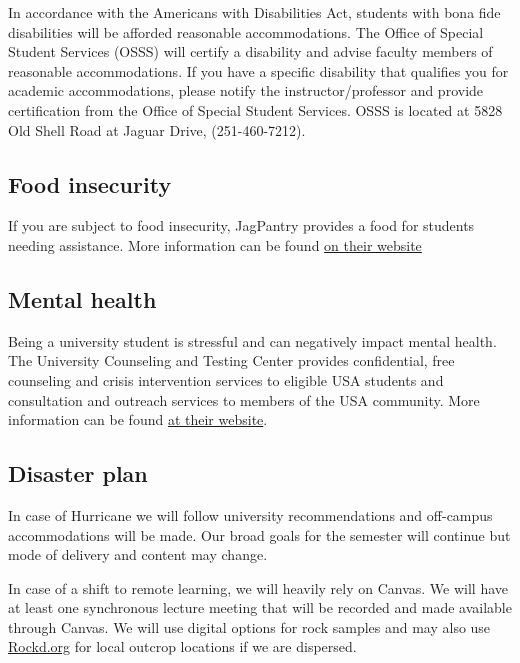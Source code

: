 \documentclass[11pt,]{article}
\begin{document}
In accordance with the Americans with Disabilities Act, students with
bona fide disabilities will be afforded reasonable accommodations. The
Office of Special Student Services (OSSS) will certify a disability and
advise faculty members of reasonable accommodations. If you have a
specific disability that qualifies you for academic accommodations,
please notify the instructor/professor and provide certification from
the Office of Special Student Services. OSSS is located at 5828 Old
Shell Road at Jaguar Drive, (251-460-7212).

\hypertarget{food-insecurity}{%
\subsection{Food insecurity}\label{food-insecurity}}

If you are subject to food insecurity, JagPantry provides a food for
students needing assistance. More information can be found
\href{https://www.southalabama.edu/departments/sga/foodpantry.html}{on
their website}

\hypertarget{mental-health}{%
\subsection{Mental health}\label{mental-health}}

Being a university student is stressful and can negatively impact mental
health. The University Counseling and Testing Center provides
confidential, free counseling and crisis intervention services to
eligible USA students and consultation and outreach services to members
of the USA community. More information can be found
\href{https://www.southalabama.edu/departments/counseling/}{at their
website}.

\hypertarget{disaster-plan}{%
\subsection{Disaster plan}\label{disaster-plan}}

In case of Hurricane we will follow university recommendations and
off-campus accommodations will be made. Our broad goals for the semester
will continue but mode of delivery and content may change.

In case of a shift to remote learning, we will heavily rely on Canvas.
We will have at least one synchronous lecture meeting that will be
recorded and made available through Canvas. We will use digital options
for rock samples and may also use \href{https://rockd.org/}{Rockd.org}
for local outcrop locations if we are dispersed.
\end{document}
